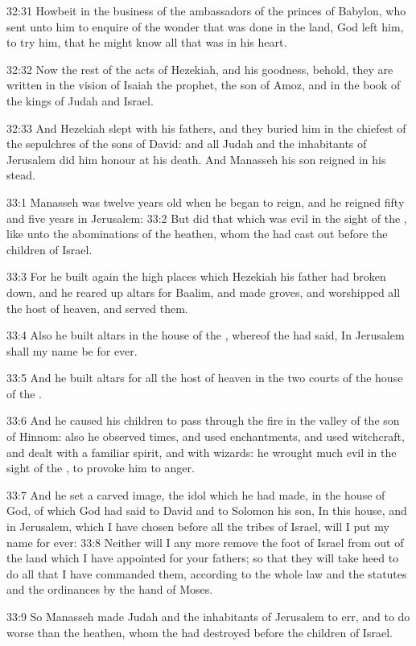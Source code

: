 32:31 Howbeit in the business of the ambassadors of the princes of
Babylon, who sent unto him to enquire of the wonder that was done in
the land, God left him, to try him, that he might know all that was in
his heart.

32:32 Now the rest of the acts of Hezekiah, and his goodness, behold,
they are written in the vision of Isaiah the prophet, the son of Amoz,
and in the book of the kings of Judah and Israel.

32:33 And Hezekiah slept with his fathers, and they buried him in the
chiefest of the sepulchres of the sons of David: and all Judah and the
inhabitants of Jerusalem did him honour at his death. And Manasseh his
son reigned in his stead.

33:1 Manasseh was twelve years old when he began to reign, and he
reigned fifty and five years in Jerusalem: 33:2 But did that which was
evil in the sight of the \LORD, like unto the abominations of the
heathen, whom the \LORD had cast out before the children of Israel.

33:3 For he built again the high places which Hezekiah his father had
broken down, and he reared up altars for Baalim, and made groves, and
worshipped all the host of heaven, and served them.

33:4 Also he built altars in the house of the \LORD, whereof the \LORD
had said, In Jerusalem shall my name be for ever.

33:5 And he built altars for all the host of heaven in the two courts
of the house of the \LORD.

33:6 And he caused his children to pass through the fire in the valley
of the son of Hinnom: also he observed times, and used enchantments,
and used witchcraft, and dealt with a familiar spirit, and with
wizards: he wrought much evil in the sight of the \LORD, to provoke him
to anger.

33:7 And he set a carved image, the idol which he had made, in the
house of God, of which God had said to David and to Solomon his son,
In this house, and in Jerusalem, which I have chosen before all the
tribes of Israel, will I put my name for ever: 33:8 Neither will I any
more remove the foot of Israel from out of the land which I have
appointed for your fathers; so that they will take heed to do all that
I have commanded them, according to the whole law and the statutes and
the ordinances by the hand of Moses.

33:9 So Manasseh made Judah and the inhabitants of Jerusalem to err,
and to do worse than the heathen, whom the \LORD had destroyed before
the children of Israel.

